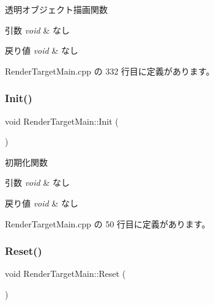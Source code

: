 透明オブジェクト描画関数 


\begin{DoxyParams}{引数}
{\em void} & なし \\
\hline
\end{DoxyParams}

\begin{DoxyRetVals}{戻り値}
{\em void} & なし \\
\hline
\end{DoxyRetVals}


 Render\+Target\+Main.\+cpp の 332 行目に定義があります。

\mbox{\label{class_render_target_main_a323281d847f7ecee50a5ac551fa163d9}} 
\subsubsection{\texorpdfstring{Init()}{Init()}}
{\footnotesize\ttfamily void Render\+Target\+Main\+::\+Init (\begin{DoxyParamCaption}{ }\end{DoxyParamCaption})}



初期化関数 


\begin{DoxyParams}{引数}
{\em void} & なし \\
\hline
\end{DoxyParams}

\begin{DoxyRetVals}{戻り値}
{\em void} & なし \\
\hline
\end{DoxyRetVals}


 Render\+Target\+Main.\+cpp の 50 行目に定義があります。

\mbox{\label{class_render_target_main_af1f2134824523e02235f849b443b4ed7}} 
\subsubsection{\texorpdfstring{Reset()}{Reset()}}
{\footnotesize\ttfamily void Render\+Target\+Main\+::\+Reset (\begin{DoxyParamCaption}{ }\end{DoxyParamCaption})}



